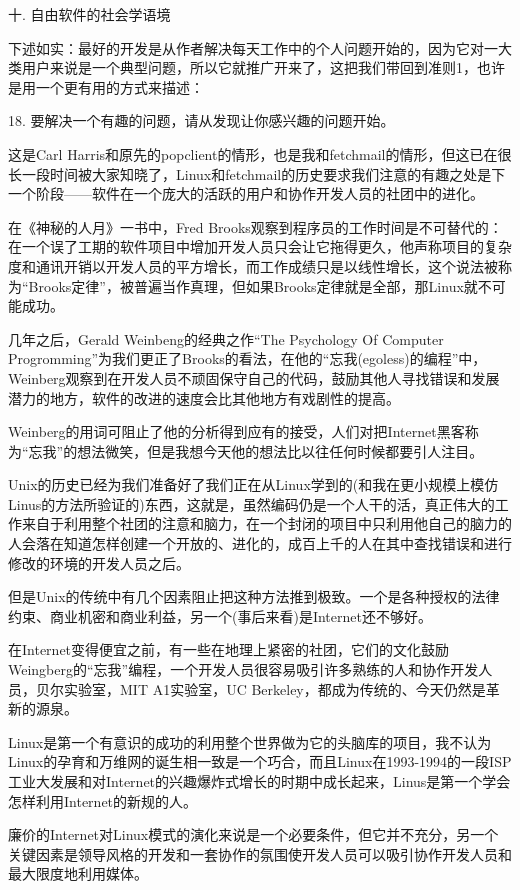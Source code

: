 \documentclass[a4paper,12pt,UTF8,twoside]{ctexbook}
\begin{document}
十. 自由软件的社会学语境


下述如实：最好的开发是从作者解决每天工作中的个人问题开始的，因为它对一大类用户来说是一个典型问题，所以它就推广开来了，这把我们带回到准则1，也许是用一个更有用的方式来描述：


18. 要解决一个有趣的问题，请从发现让你感兴趣的问题开始。


这是Carl Harris和原先的popclient的情形，也是我和fetchmail的情形，但这已在很长一段时间被大家知晓了，Linux和fetchmail的历史要求我们注意的有趣之处是下一个阶段——软件在一个庞大的活跃的用户和协作开发人员的社团中的进化。


在《神秘的人月》一书中，Fred Brooks观察到程序员的工作时间是不可替代的：在一个误了工期的软件项目中增加开发人员只会让它拖得更久，他声称项目的复杂度和通讯开销以开发人员的平方增长，而工作成绩只是以线性增长，这个说法被称为“Brooks定律”，被普遍当作真理，但如果Brooks定律就是全部，那Linux就不可能成功。


几年之后，Gerald Weinbeng的经典之作“The Psychology Of Computer Progromming”为我们更正了Brooks的看法，在他的“忘我(egoless)的编程”中，Weinberg观察到在开发人员不顽固保守自己的代码，鼓励其他人寻找错误和发展潜力的地方，软件的改进的速度会比其他地方有戏剧性的提高。


Weinberg的用词可阻止了他的分析得到应有的接受，人们对把Internet黑客称为“忘我”的想法微笑，但是我想今天他的想法比以往任何时候都要引人注目。


Unix的历史已经为我们准备好了我们正在从Linux学到的(和我在更小规模上模仿Linus的方法所验证的)东西，这就是，虽然编码仍是一个人干的活，真正伟大的工作来自于利用整个社团的注意和脑力，在一个封闭的项目中只利用他自己的脑力的人会落在知道怎样创建一个开放的、进化的，成百上千的人在其中查找错误和进行修改的环境的开发人员之后。


但是Unix的传统中有几个因素阻止把这种方法推到极致。一个是各种授权的法律约束、商业机密和商业利益，另一个(事后来看)是Internet还不够好。


在Internet变得便宜之前，有一些在地理上紧密的社团，它们的文化鼓励Weingberg的“忘我”编程，一个开发人员很容易吸引许多熟练的人和协作开发人员，贝尔实验室，MIT A1实验室，UC Berkeley，都成为传统的、今天仍然是革新的源泉。


Linux是第一个有意识的成功的利用整个世界做为它的头脑库的项目，我不认为Linux的孕育和万维网的诞生相一致是一个巧合，而且Linux在1993-1994的一段ISP工业大发展和对Internet的兴趣爆炸式增长的时期中成长起来，Linus是第一个学会怎样利用Internet的新规的人。


廉价的Internet对Linux模式的演化来说是一个必要条件，但它并不充分，另一个关键因素是领导风格的开发和一套协作的氛围使开发人员可以吸引协作开发人员和最大限度地利用媒体。
\end{document}
